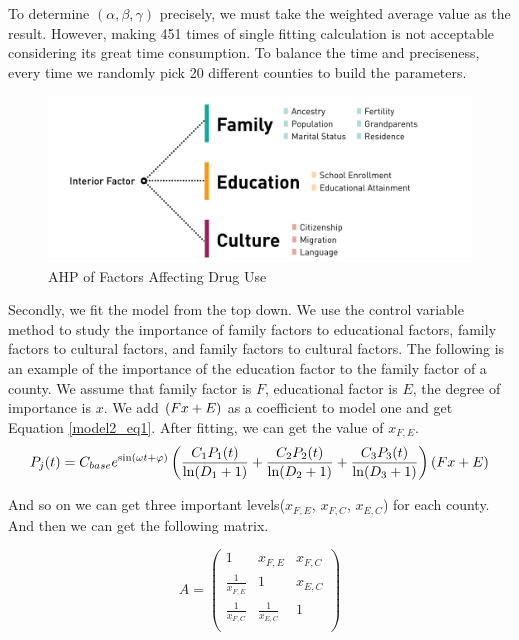 \documentclass{mcmthesis}
\begin{document}
 To determine $(\alpha, \beta, \gamma)$ precisely, we must take the weighted average value as the result. However, making 451 times of single fitting calculation is not acceptable considering its great time consumption. To balance the time and preciseness, every time we randomly pick 20 different counties to build the parameters.
 
\begin{figure}[h]
	\centering
	\includegraphics[width=15cm]{figure-release/Model2.LayerMap.png}
	\caption{AHP of Factors Affecting Drug Use}\label{model2_layer}
\end{figure}

Secondly, we fit the model from the top down. We use the control variable method to study the importance of family factors to educational factors, family factors to cultural factors, and family factors to cultural factors. The following is an example of the importance of the education factor to the family factor of a county. We assume that family factor is $F$, educational factor is $E$, the degree of importance is $x$. We add $\left( F\*x+E\right) $ as a coefficient to model one and get Equation \eqref{model2_eq1}. After fitting, we can get the value of $x_{F,E}$.
\begin{equation}
P_{j}(t) = C_{base} e^{\sin (\omega t+\varphi)} \left(\frac{C_1 P_1(t)}{\ln (D_1+1)}+\frac{C_2 P_2(t)}{\ln (D_2+1)}+\frac{C_3 P_3(t)}{\ln (D_3+1)}\right)\left( F\*x+E\right)
\label{model2_eq1}
\end{equation}

And so on we can get three important levels($x_{F,E}$, $x_{F,C}$, $x_{E,C}$) for each county. And then we can get the following matrix.

\[A=
\begin{pmatrix}
{1 } & {x_{F,E} } & {x_{F,C} }  \\
{\frac{1}{x_{F,E}}} & {1 } & {x_{E,C} }  \\
{\frac{1}{x_{F,C} } } & {\frac{1}{x_{E,C}} } & {1}  \\
\end{pmatrix}
\]
\end{document}
